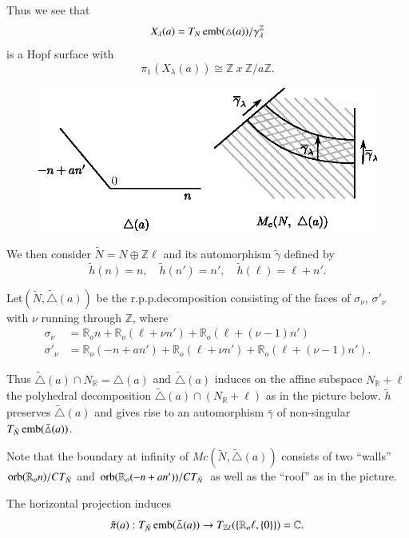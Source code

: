 Thus we see that 
$$
X_{\lambda}(a) = T_{N} \operatorname{emb} (\triangle(a)) / \gamma^\mathbb{Z}_{\lambda}
$$
is a Hopf surface with 
$$
\pi_{1}(X_{\lambda}(a)) \cong \mathbb{Z}~ x~ \mathbb{Z}/
a\mathbb{Z}.
$$
 \begin{figure}[H]
\centering 
\includegraphics{vol58-fig/fig58-69.eps} 
\end{figure}

We then consider $\tilde{N} = N \oplus \mathbb{Z} \ell$ and its
automorphism $\tilde{\gamma}$ defined by  
$$
\tilde{h}(n) = n, \quad \tilde{h}(n') = n' ,  \quad \tilde{h} (\ell) =
\ell + n'. 
$$

Let\pageoriginale $(\tilde{N}, \tilde{\triangle}(a))$ be the
r.p.p.decomposition consisting of the faces of $\sigma_{\nu}$,
$\sigma'_{\nu}$ with $\nu$ running through $\mathbb{Z}$, where  
\begin{align*}
\sigma_{\nu} & = \mathbb{R}_{o}n + \mathbb{R}_{o} (\ell + \nu n') +
\mathbb{R}_{o} (\ell + (\nu - 1) n')\\ 
\sigma'_{\nu} & =  \mathbb{R}_{o} (-n + an') +  \mathbb{R}_{o} (\ell +
\nu n') + \mathbb{R}_{o} (\ell + (\nu - 1) n'). 
\end{align*}
 
\noindent 
Thus $\tilde{\triangle}(a) \cap N_{\mathbb{R}} = \triangle (a)$ and
$\tilde{\triangle}(a)$ induces on the affine subspace $N_{\mathbb{R}}
+ \ell$ the polyhedral decomposition $\tilde{\triangle}(a) \cap
(N_{\mathbb{R}} + \ell)$ as in the picture below. $\tilde{h}$
preserves $\tilde{\triangle}(a)$ and gives rise to an automorphism
$\bar{\gamma}$ of non-singular $T_{\tilde{N}} \operatorname{emb}
(\tilde{\triangle}(a))$.  
 
\noindent
Note that the boundary at infinity of $Mc (\tilde{N}, \tilde{\triangle
}(a))$ consists of two ``walls'' $\operatorname{orb} (\mathbb{R}_{o}n) /
CT_{\tilde{N}}$ and $\operatorname{orb} (\mathbb{R}_{o} (-n +  an')) /
CT_{\tilde{N}}$  as well as the ``roof'' as in the picture.    
 
The horizontal projection induces 
$$
\tilde{\pi}(a) : T_{\tilde{N}} \operatorname{emb} (\tilde{\triangle} (a)) \to
T_{\mathbb{Z} \ell} (\{ \mathbb{R}_{o}\ell, \{0\} \}) = \mathbb{C}. 
$$ 
 
